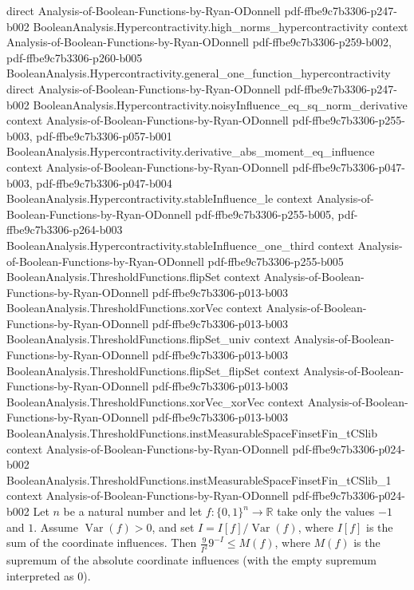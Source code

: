 \begin{theorem}
  {direct}
  {Analysis-of-Boolean-Functions-by-Ryan-ODonnell}
  {pdf-ffbe9c7b3306-p247-b002}
\proofstep
  {BooleanAnalysis.Hypercontractivity.high_norms_hypercontractivity}
  {context}
  {Analysis-of-Boolean-Functions-by-Ryan-ODonnell}
  {pdf-ffbe9c7b3306-p259-b002,
    pdf-ffbe9c7b3306-p260-b005}
\proofstep
  {BooleanAnalysis.Hypercontractivity.general_one_function_hypercontractivity}
  {direct}
  {Analysis-of-Boolean-Functions-by-Ryan-ODonnell}
  {pdf-ffbe9c7b3306-p247-b002}
\proofstep
  {BooleanAnalysis.Hypercontractivity.noisyInfluence_eq_sq_norm_derivative}
  {context}
  {Analysis-of-Boolean-Functions-by-Ryan-ODonnell}
  {pdf-ffbe9c7b3306-p255-b003,
    pdf-ffbe9c7b3306-p057-b001}
\proofstep
  {BooleanAnalysis.Hypercontractivity.derivative_abs_moment_eq_influence}
  {context}
  {Analysis-of-Boolean-Functions-by-Ryan-ODonnell}
  {pdf-ffbe9c7b3306-p047-b003,
    pdf-ffbe9c7b3306-p047-b004}
\proofstep
  {BooleanAnalysis.Hypercontractivity.stableInfluence_le}
  {context}
  {Analysis-of-Boolean-Functions-by-Ryan-ODonnell}
  {pdf-ffbe9c7b3306-p255-b005,
    pdf-ffbe9c7b3306-p264-b003}
\proofstep
  {BooleanAnalysis.Hypercontractivity.stableInfluence_one_third}
  {context}
  {Analysis-of-Boolean-Functions-by-Ryan-ODonnell}
  {pdf-ffbe9c7b3306-p255-b005}
\proofstep
  {BooleanAnalysis.ThresholdFunctions.flipSet}
  {context}
  {Analysis-of-Boolean-Functions-by-Ryan-ODonnell}
  {pdf-ffbe9c7b3306-p013-b003}
\proofstep
  {BooleanAnalysis.ThresholdFunctions.xorVec}
  {context}
  {Analysis-of-Boolean-Functions-by-Ryan-ODonnell}
  {pdf-ffbe9c7b3306-p013-b003}
\proofstep
  {BooleanAnalysis.ThresholdFunctions.flipSet_univ}
  {context}
  {Analysis-of-Boolean-Functions-by-Ryan-ODonnell}
  {pdf-ffbe9c7b3306-p013-b003}
\proofstep
  {BooleanAnalysis.ThresholdFunctions.flipSet_flipSet}
  {context}
  {Analysis-of-Boolean-Functions-by-Ryan-ODonnell}
  {pdf-ffbe9c7b3306-p013-b003}
\proofstep
  {BooleanAnalysis.ThresholdFunctions.xorVec_xorVec}
  {context}
  {Analysis-of-Boolean-Functions-by-Ryan-ODonnell}
  {pdf-ffbe9c7b3306-p013-b003}
\proofstep
  {BooleanAnalysis.ThresholdFunctions.instMeasurableSpaceFinsetFin_tCSlib}
  {context}
  {Analysis-of-Boolean-Functions-by-Ryan-ODonnell}
  {pdf-ffbe9c7b3306-p024-b002}
\proofstep
  {BooleanAnalysis.ThresholdFunctions.instMeasurableSpaceFinsetFin_tCSlib_1}
  {context}
  {Analysis-of-Boolean-Functions-by-Ryan-ODonnell}
  {pdf-ffbe9c7b3306-p024-b002}
Let $n$ be a natural number and let $f:\{0,1\}^n\to\mathbb R$ take only the values $-1$
and $1$. Assume $\operatorname{Var}(f)>0$, and set $I=I[f]/\operatorname{Var}(f)$, where
$I[f]$ is the sum of the coordinate influences. Then $\frac{9}{I^2}9^{-I}\le M(f)$,
where $M(f)$ is the supremum of the absolute coordinate influences (with the empty
supremum interpreted as $0$).
\end{theorem}

